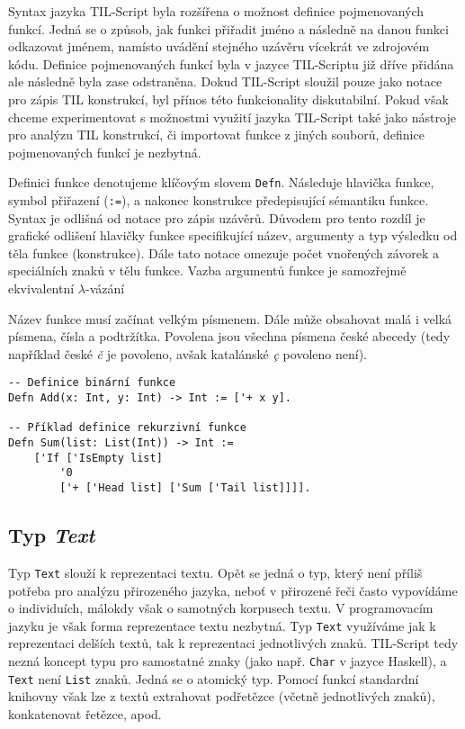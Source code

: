 Syntax jazyka TIL-Script byla rozšířena o možnost definice pojmenovaných funkcí. Jedná se o způsob,
jak funkci přiřadit jméno a následně na danou funkci odkazovat jménem, namísto uvádění stejného
uzávěru vícekrát ve zdrojovém kódu. Definice pojmenovaných funkcí byla v jazyce TIL-Scriptu již
dříve přidána ale následně byla zase odstraněna. Dokud TIL-Script sloužil pouze jako notace pro
zápis TIL konstrukcí, byl přínos této funkcionality diskutabilní. Pokud však chceme experimentovat
s možnostmi využití jazyka TIL-Script také jako nástroje pro analýzu TIL konstrukcí, či importovat
funkce z jiných souborů, definice pojmenovaných funkcí je nezbytná.

Definici funkce denotujeme klíčovým slovem \lstinline{Defn}. Následuje hlavička funkce, symbol
přiřazení (\lstinline{:=}), a nakonec konstrukce předepisující sémantiku funkce. Syntax je odlišná
od notace pro zápis uzávěrů. Důvodem pro tento rozdíl je grafické odlišení hlavičky funkce
specifikující název, argumenty a typ výsledku od těla funkce (konstrukce). Dále tato notace
omezuje počet vnořených závorek a speciálních znaků v tělu funkce. Vazba argumentů funkce je
samozřejmě ekvivalentní $\lambda$-vázání

Název funkce musí začínat velkým písmenem. Dále může obsahovat malá i velká písmena, čísla
a podtržítka. Povolena jsou všechna písmena české abecedy (tedy například české \textit{č} je
povoleno, avšak katalánské \textit{\c{c}} povoleno není).

\begin{lstlisting}[caption={Příklad definice funkcí}]
-- Definice binární funkce
Defn Add(x: Int, y: Int) -> Int := ['+ x y].

-- Příklad definice rekurzivní funkce
Defn Sum(list: List(Int)) -> Int :=
    ['If ['IsEmpty list]
        '0
        ['+ ['Head list] ['Sum ['Tail list]]]].
\end{lstlisting}

\subsection{Typ \textit{Text}}\label{text-type}

Typ \lstinline{Text} slouží k reprezentaci textu. Opět se jedná o typ, který není příliš potřeba
pro analýzu přirozeného jazyka, neboť v přirozené řeči často vypovídáme o individuích, málokdy však
o samotných korpusech textu. V programovacím jazyku je však forma reprezentace textu nezbytná.
Typ \lstinline{Text} využíváme jak k reprezentaci delších textů, tak k reprezentaci jednotlivých
znaků. TIL-Script tedy nezná koncept typu pro samostatné znaky (jako např. \lstinline{Char}
v jazyce Haskell), a \lstinline{Text} není \lstinline{List} znaků. Jedná se o atomický typ. Pomocí
funkcí standardní knihovny však lze z textů extrahovat podřetězce (včetně jednotlivých znaků),
konkatenovat řetězce, apod.

